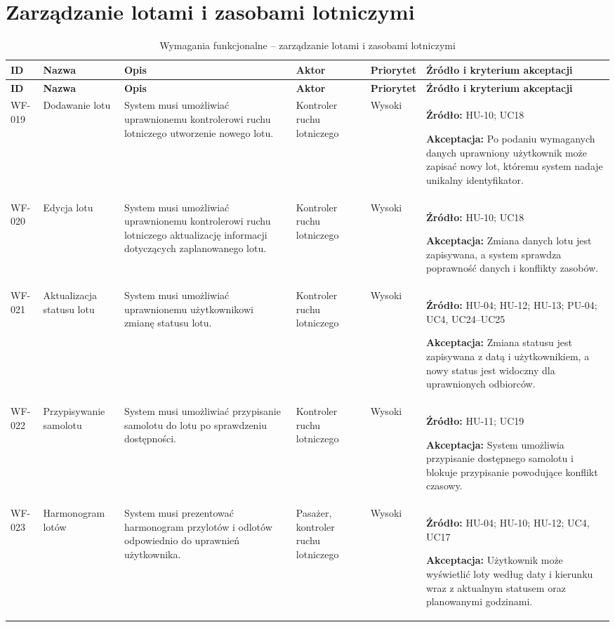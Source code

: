 \documentclass[12pt,a4paper,oneside]{report}
\begin{document}
\section{Zarządzanie lotami i zasobami lotniczymi}
\small
\begin{longtable}{|p{1.05cm}|p{2.15cm}|p{3.35cm}|p{1.75cm}|p{0.95cm}|p{4.05cm}|}
\caption{Wymagania funkcjonalne -- zarządzanie lotami i zasobami lotniczymi}\\\hline
\rowcolor{lightblue}\textbf{ID} & \textbf{Nazwa} & \textbf{Opis} & \textbf{Aktor} & \textbf{Priorytet} & \textbf{Źródło i kryterium akceptacji}\\\hline
\endfirsthead
\hline
\rowcolor{lightblue}\textbf{ID} & \textbf{Nazwa} & \textbf{Opis} & \textbf{Aktor} & \textbf{Priorytet} & \textbf{Źródło i kryterium akceptacji}\\\hline
\endhead
WF-019 & Dodawanie lotu & System musi umożliwiać uprawnionemu kontrolerowi ruchu lotniczego utworzenie nowego lotu. & Kontroler ruchu lotniczego & Wysoki & \textbf{Źródło:} HU-10; UC18\par\textbf{Akceptacja:} Po podaniu wymaganych danych uprawniony użytkownik może zapisać nowy lot, któremu system nadaje unikalny identyfikator.\\\hline
WF-020 & Edycja lotu & System musi umożliwiać uprawnionemu kontrolerowi ruchu lotniczego aktualizację informacji dotyczących zaplanowanego lotu. & Kontroler ruchu lotniczego & Wysoki & \textbf{Źródło:} HU-10; UC18\par\textbf{Akceptacja:} Zmiana danych lotu jest zapisywana, a system sprawdza poprawność danych i konflikty zasobów.\\\hline
WF-021 & Aktualizacja statusu lotu & System musi umożliwiać uprawnionemu użytkownikowi zmianę statusu lotu. & Kontroler ruchu lotniczego & Wysoki & \textbf{Źródło:} HU-04; HU-12; HU-13; PU-04; UC4, UC24–UC25\par\textbf{Akceptacja:} Zmiana statusu jest zapisywana z datą i użytkownikiem, a nowy status jest widoczny dla uprawnionych odbiorców.\\\hline
WF-022 & Przypisywanie samolotu & System musi umożliwiać przypisanie samolotu do lotu po sprawdzeniu dostępności. & Kontroler ruchu lotniczego & Wysoki & \textbf{Źródło:} HU-11; UC19\par\textbf{Akceptacja:} System umożliwia przypisanie dostępnego samolotu i blokuje przypisanie powodujące konflikt czasowy.\\\hline
WF-023 & Harmonogram lotów & System musi prezentować harmonogram przylotów i odlotów odpowiednio do uprawnień użytkownika. & Pasażer, kontroler ruchu lotniczego & Wysoki & \textbf{Źródło:} HU-04; HU-10; HU-12; UC4, UC17\par\textbf{Akceptacja:} Użytkownik może wyświetlić loty według daty i kierunku wraz z aktualnym statusem oraz planowanymi godzinami.\\\hline

\end{longtable}
\end{document}
